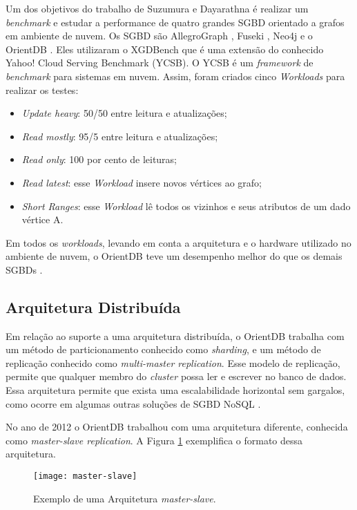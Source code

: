 	Um dos objetivos do trabalho de Suzumura e Dayarathna \cite{dayarathna2012xgdbench} é realizar um \textit{benchmark} e estudar a performance de quatro grandes SGBD orientado a grafos em ambiente de nuvem. Os SGBD são AllegroGraph \cite{allegro}, Fuseki \cite{fuseki}, Neo4j \cite{neo4j-site} e o OrientDB \cite{orientdb-site}. Eles utilizaram o XGDBench que é uma extensão do conhecido Yahoo! Cloud Serving Benchmark (YCSB). O YCSB é um \textit{framework} de \textit{benchmark} para sistemas em nuvem. Assim, foram criados cinco \textit{Workloads} para realizar os testes:

\begin{itemize}
	\item  \textit{Update heavy}: 50/50 entre leitura e atualizações;
	\item  \textit{Read mostly}: 95/5 entre leitura e atualizações;
	\item  \textit{Read only}: 100 por cento de leituras;
	\item  \textit{Read latest}: esse \textit{Workload} insere novos vértices ao grafo;
	\item  \textit{Short Ranges}: esse \textit{Workload} lê todos os vizinhos e seus atributos de um dado vértice A.
\end{itemize}

	Em todos os \textit{workloads}, levando em conta a arquitetura e o hardware utilizado no ambiente de nuvem, o OrientDB teve um desempenho melhor do que os demais SGBDs \cite{dayarathna2012xgdbench}.
	
	
\subsection{Arquitetura Distribuída} \label{orient_distributed}
	Em relação ao suporte a uma arquitetura distribuída, o OrientDB trabalha com um método de particionamento conhecido como \textit{sharding}, e um método de replicação conhecido como \textit{multi-master replication}. Esse modelo de replicação, permite que qualquer membro do \textit{cluster} possa ler e escrever no banco de dados. Essa arquitetura permite que exista uma escalabilidade horizontal sem gargalos, como ocorre em algumas outras soluções de SGBD NoSQL \cite{kauremerging}.
	
	No ano de 2012 o OrientDB trabalhou com uma arquitetura diferente, conhecida como \textit{master-slave replication}. A Figura \ref{fig:master-slave} exemplifica o formato dessa arquitetura.
	
\begin{figure}[h]
	\centering
    \texttt{[image: master-slave]}
    \caption{Exemplo de uma Arquitetura \textit{master-slave}.}
    \label{fig:master-slave}
\end{figure}

